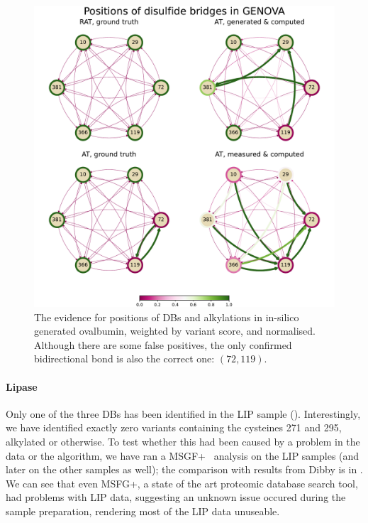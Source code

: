 \begin{figure}
  \centering
  \includegraphics[width=1\linewidth]{img/genova.pdf}
  \caption{The evidence for positions of DBs and alkylations in in-silico generated ovalbumin, weighted by variant score, and normalised. Although there are some false positives, the only confirmed bidirectional bond is also the correct one: \((72, 119)\).}\label{fig:genova}
\end{figure}

\paragraph{Lipase} Only one of the three DBs has been identified in the LIP sample (). Interestingly, we have identified exactly zero variants containing the cysteines 271 and 295, alkylated or otherwise. To test whether this had been caused by a problem in the data or the algorithm, we have ran a MSGF+~\cite{kim2014ms} analysis on the LIP samples (and later on the other samples as well); the comparison with results from Dibby is in . We can see that even MSFG+, a state of the art proteomic database search tool, had problems with LIP data, suggesting an unknown issue occured during the sample preparation, rendering most of the LIP data unuseable.


